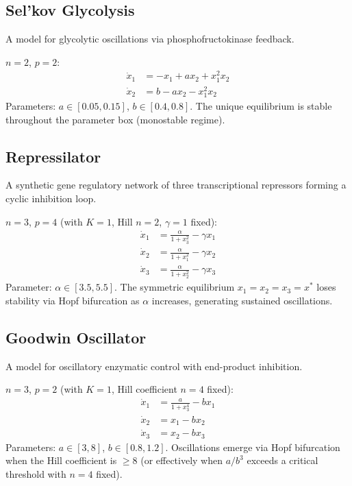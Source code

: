 \documentclass[11pt]{article}
\begin{document}
\subsection{Sel'kov Glycolysis}

A model for glycolytic oscillations via phosphofructokinase feedback.

$n=2$, $p=2$:
\begin{align*}
\dot{x}_1 &= -x_1 + ax_2 + x_1^2 x_2 \\
\dot{x}_2 &= b - ax_2 - x_1^2 x_2
\end{align*}
Parameters: $a \in [0.05, 0.15]$, $b \in [0.4, 0.8]$.
The unique equilibrium is stable throughout the parameter box (monostable regime).

\subsection{Repressilator~\cite{elowitz2000repressilator}}

A synthetic gene regulatory network of three transcriptional repressors forming a cyclic inhibition loop.

$n=3$, $p=4$ (with $K=1$, Hill $n=2$, $\gamma=1$ fixed):
\begin{align*}
\dot{x}_1 &= \frac{\alpha}{1 + x_3^2} - \gamma x_1 \\
\dot{x}_2 &= \frac{\alpha}{1 + x_1^2} - \gamma x_2 \\
\dot{x}_3 &= \frac{\alpha}{1 + x_2^2} - \gamma x_3
\end{align*}
Parameter: $\alpha \in [3.5, 5.5]$.
The symmetric equilibrium $x_1 = x_2 = x_3 = x^*$ loses stability via Hopf bifurcation as $\alpha$ increases, generating sustained oscillations.

\subsection{Goodwin Oscillator~\cite{goodwin1965oscillatory}}

A model for oscillatory enzymatic control with end-product inhibition.

$n=3$, $p=2$ (with $K=1$, Hill coefficient $n=4$ fixed):
\begin{align*}
\dot{x}_1 &= \frac{a}{1 + x_3^4} - bx_1 \\
\dot{x}_2 &= x_1 - bx_2 \\
\dot{x}_3 &= x_2 - bx_3
\end{align*}
Parameters: $a \in [3, 8]$, $b \in [0.8, 1.2]$.
Oscillations emerge via Hopf bifurcation when the Hill coefficient is $\geq 8$ (or effectively when $a/b^3$ exceeds a critical threshold with $n=4$ fixed).
\end{document}
